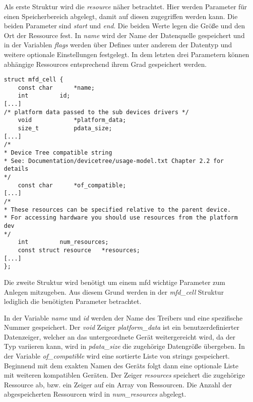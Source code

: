 Als erste Struktur wird die \textit{resource} näher betrachtet. Hier werden Parameter für einen Speicherbereich abgelegt, damit auf diesen zugegriffen werden kann. 
Die beiden Parameter sind \textit{start} und \textit{end}. Die beiden Werte legen die Größe und den Ort der Ressource fest. 
In \textit{name} wird der Name der Datenquelle gespeichert und in der Variablen \textit{flags} werden über Defines unter anderem der Datentyp und weitere optionale Einstellungen festgelegt.
In dem letzten drei Parametern können abhängige Ressources entsprechend ihrem Grad gespeichert werden. \\

\begin{lstfloat}
\begin{lstlisting}
struct mfd_cell {
	const char		*name;
	int			id;
[...]
/* platform data passed to the sub devices drivers */
	void			*platform_data;
	size_t			pdata_size;	
[...]	
/*
* Device Tree compatible string
* See: Documentation/devicetree/usage-model.txt Chapter 2.2 for details
*/
	const char		*of_compatible;	
[...]	
/*
* These resources can be specified relative to the parent device.
* For accessing hardware you should use resources from the platform dev
*/
	int			num_resources;
	const struct resource	*resources;	
[...]
};
\end{lstlisting}
\end{lstfloat}

Die zweite Struktur wird benötigt um einem \ac{mfd} wichtige Parameter zum Anlegen mitzugeben. Aus diesem Grund werden in der \textit{mfd\_cell} Struktur lediglich die benötigten Parameter betrachtet. 

In der Variable \textit{name} und \textit{id} werden der Name des Treibers und eine spezifische Nummer gespeichert.
Der \textit{void} Zeiger \textit{platform\_data} ist ein benutzerdefinierter Datenzeiger, welcher an das untergeordnete Gerät weitergereicht wird, da der Typ variieren kann, wird in \textit{pdata\_size} die zugehörige Datengröße übergeben. 
In der Variable \textit{of\_compatible} wird eine sortierte Liste von strings gespeichert. Beginnend mit dem exakten Namen des Geräts folgt dann eine optionale Liste mit weiteren kompatiblen Geräten. \cite[devicetree/usage\_model.txt, Zeile 116ff.]{linuxsourcedocu} 
Der Zeiger \textit{resources} speichert die zugehörige Ressource ab, bzw. ein Zeiger auf ein Array von Ressourcen. Die Anzahl der abgespeicherten Ressourcen wird in \textit{num\_resources} abgelegt.\\


